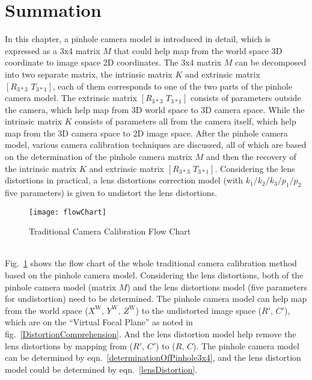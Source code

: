 \section{Summation}
%
\indent
\indent In this chapter, a pinhole camera model is introduced in detail, which is expressed as a 3x4 matrix \(M\) that could help map from the world space 3D coordinate to image space 2D coordinates. The 3x4 matrix \(M\) can be decomposed into two separate matrix, the intrinsic matrix \(K\) and extrinsic matrix \([R_{3*3}\,\,T_{3*1}]\), each of them corresponds to one of the two parts of the pinhole camera model. The extrinsic matrix \([R_{3*3}\,\,T_{3*1}]\) consists of parameters outside the camera, which help map from 3D world space to 3D camera space. While the intrinsic matrix \(K\) consists of parameters all from the camera itself, which help map from the 3D camera space to 2D image space. After the pinhole camera model, various camera calibration techniques are discussed, all of which are based on the determination of the pinhole camera matrix \(M\) and then the recovery of the intrinsic matrix \(K\) and extrinsic matrix \([R_{3*3}\,\,T_{3*1}]\). Considering the lens distortions in practical, a lens distortions correction model (with  \(k_1/k_2/k_3/p_1/p_2\) five parameters) is given to undistort the lens distortions. 
%
\begin{figure}[t]
\centering
\texttt{[image: flowChart]}
\caption{Traditional Camera Calibration Flow Chart}
\label{flowChart}
\end{figure}%
\\\indent
Fig.~\ref{flowChart} shows the flow chart of the whole traditional camera calibration method based on the pinhole camera model. Considering the lens distortions, both of the pinhole camera model (matrix \(M\)) and the lens distortions model (five parameters for undistortion) need to be determined. The pinhole camera model can help map from the world space (\(X^\text{W}, \, Y^\text{W}, \, Z^\text{W}\)) to the undistorted image space (\(R', \, C'\)), which are on the \enquote{Virtual Focal Plane} as noted in fig.~\ref{DistortionComprehension}. And the lens distortion model help remove the lens distortions by mapping from (\(R', \, C'\)) to (\(R, \, C\)). The pinhole camera model can be determined by eqn.~\ref{determinationOfPinhole3x4}, and the lens distortion model could be determined by eqn.~\ref{lensDistortion}.






